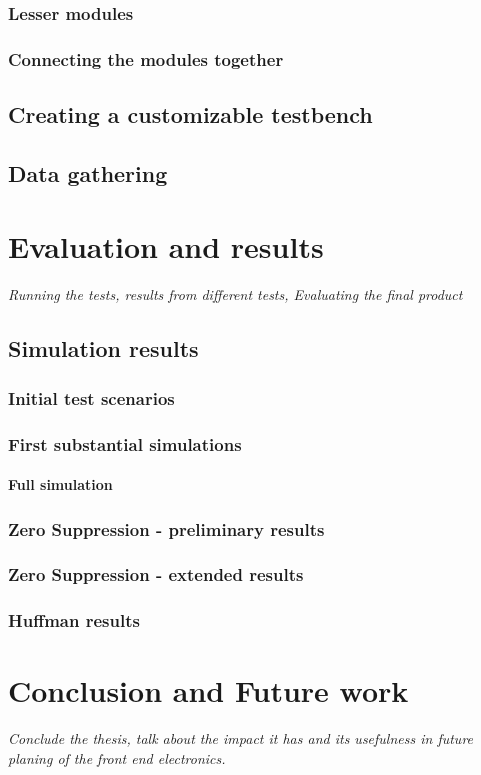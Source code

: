 \documentclass[a4paper, 12pt]{report}
\begin{document}



\subsection{Lesser modules}
\subsection{Connecting the modules together}
\section{Creating a customizable testbench}
\section{Data gathering}

\chapter{Evaluation and results}
\textit{Running the tests, results from different tests, Evaluating the final product}
\section{Simulation results}
\subsection{Initial test scenarios}
\subsection{First substantial simulations}
\subsubsection{Full simulation}

\subsection{Zero Suppression - preliminary results}
\subsection{Zero Suppression - extended results}
\subsection{Huffman results}

\chapter{Conclusion and Future work}
\textit{Conclude the thesis, talk about the impact it has and its usefulness in future planing of the front end electronics.}

{}

\end{document}
